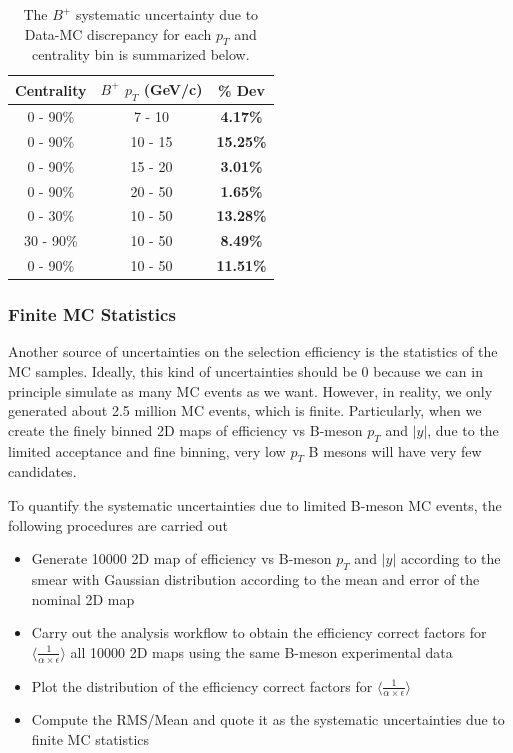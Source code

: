 \begin{table}[h]
\begin{center}
\caption{The $B^+$ systematic uncertainty due to Data-MC discrepancy for each $p_T$ and centrality bin is summarized below.}
\vspace{1em}
\label{BPMCDataSyst}
  \begin{tabular}{| c | c |c |}
    \hline
     Centrality & $B^+$ $p_T$ (GeV/c) & \% Dev \\
    \hline
    \hline
0 - 90\% & 7 - 10 &   \textbf{4.17\% }     \\ 
0 - 90\% & 10 - 15 & \textbf{15.25\% }    \\ 
0 - 90\% & 15 - 20 &  \textbf{3.01\% }     \\ 
0 - 90\% & 20 - 50 &  \textbf{1.65\% }    \\ 
0 - 30\% & 10 - 50 &   \textbf{13.28\% }  \\ 
30 - 90\% & 10 - 50 & \textbf{8.49\% }    \\ 
0 - 90\% & 10 - 50 &  \textbf{11.51\% }   \\ 
    \hline
    \hline
\end{tabular}
\end{center}
\end{table}


\subsubsection{Finite MC Statistics}

Another source of uncertainties on the selection efficiency is the statistics of the MC samples. Ideally, this kind of uncertainties should be 0 because we can in principle simulate as many MC events as we want. However, in reality, we only generated about 2.5 million MC events, which is finite. Particularly, when we create the finely binned 2D maps of efficiency vs B-meson $p_T$ and $|y|$, due to the limited acceptance and fine binning, very low $p_T$ B mesons will have very few candidates.

To quantify the systematic uncertainties due to limited B-meson MC events, the following procedures are carried out

\begin{itemize}
\item Generate 10000 2D map of efficiency vs B-meson $p_T$ and $|y|$ according to the smear with Gaussian distribution according to the mean and error of the nominal 2D map
\item Carry out the analysis workflow to obtain the efficiency correct factors for $\langle\frac{1}{\alpha \times \epsilon}\rangle$ all 10000 2D maps using the same B-meson experimental data 
\item Plot the distribution of the efficiency correct factors for $\langle\frac{1}{\alpha \times \epsilon}\rangle$
\item Compute the RMS/Mean and quote it as the systematic uncertainties due to finite MC statistics
\end{itemize}

